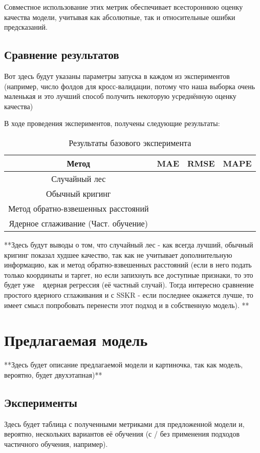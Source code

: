 \documentclass{article}
\begin{document}
Совместное использование этих метрик обеспечивает всестороннюю оценку качества модели, учитывая как абсолютные, так и относительные ошибки предсказаний.

\subsection{Сравнение результатов}
Вот здесь будут указаны параметры запуска в каждом из экспериментов (например, число фолдов для кросс-валидации, потому что наша выборка очень маленькая и это лучший способ получить некоторую усреднённую оценку качества)

В ходе проведения экспериментов, получены следующие результаты:
\begin{table}
    \centering
    \begin{tabular}{|c| c| c| c|}
        \hline
         Метод & MAE & RMSE & MAPE \\
          \hline
         Случайный лес & & & \\
         Обычный кригинг & & & \\
         Метод обратно-взвешенных расстояний & & & \\
         Ядерное сглаживание (Част. обучение) & & & \\
        \hline
    \end{tabular}
    \caption{Результаты базового эксперимента}
    \label{tab:base_results}
\end{table}

**Здесь будут выводы о том, что случайный лес - как всегда лучший, обычный кригинг показал худшее качество, так как не учитывает дополнительную информацию, как и метод обратно-взвешенных расстояний (если в него подать только координаты и таргет, но если запихнуть все доступные признаки, то это будет уже ~ ядерная регрессия (её частный случай). Тогда интересно сравнение простого ядерного сглаживания и с SSKR - если последнее окажется лучше, то имеет смысл попробовать перенести этот подход и в собственную модель). **

\section{Предлагаемая модель}
**Здесь будет описание предлагаемой модели и картиночка, так как модель, вероятно, будет двухэтапная)**

\subsection{Эксперименты}
Здесь будет таблица с полученными метриками для предложенной модели и, вероятно, нескольких вариантов её обучения (с / без применения подходов частичного обучения, например).
\end{document}
